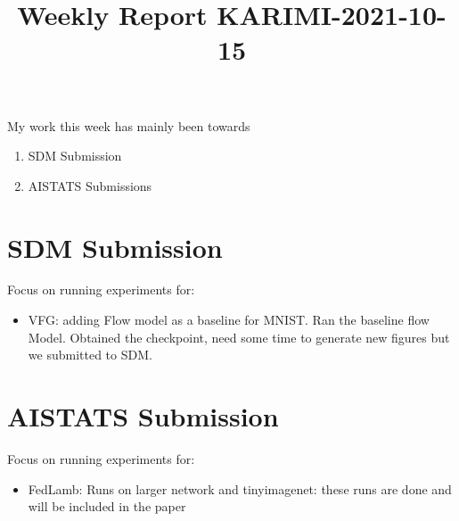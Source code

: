\documentclass{article}
\begin{document}
\title{Weekly Report KARIMI-2021-10-15}


\date{}
\maketitle

\vspace{-0.5in}


My work this week has mainly been towards
\begin{enumerate}
\item SDM Submission
\item AISTATS Submissions
\end{enumerate}

\section{SDM Submission}
Focus on running experiments for:
\begin{itemize}
\item VFG: adding Flow model as a baseline for MNIST. Ran the baseline flow Model. Obtained the checkpoint, need some time to generate new figures but we submitted to SDM.
\end{itemize}



\section{AISTATS Submission}
Focus on running experiments for:
\begin{itemize}
\item FedLamb: Runs on larger network and tinyimagenet: these runs are done and will be included in the paper
\end{itemize}
\end{document}

